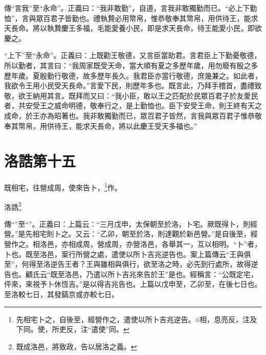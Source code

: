 {\noindent\zhuan{}\fzbyks 傳“言我”至“永命”。正義曰：“我非敢勤”，自道，言我非敢獨勤而已。“必上下勤恤”，言與眾百君子皆勤也。禮執贄必用幣帛，惟恭敬奉其幣帛，用供待王，能求天長命。將以執贄慶王多福，毛能愛養小民，即是求天長命，待王能愛小民，即欲慶之。 \par}

{\noindent\shu{}\fzkt “上下”至“永命”。正義曰：上既勸王敬德，又言臣當助君。言君臣上下勤憂敬德，所以勤者，其言曰：“我周家既受天命，當大順有夏之多歷年歲，用勿廢有殷之多歷年歲。夏殷勤行敬德，故多歷年長久。我君臣亦當行敬德，庶幾兼之。如此者，我欲令王用小民受天長命。”言愛下民，則歷年多也。既言此，乃拜手稽首，盡禮致敬，欲王納用其言。既拜而又曰：“我小臣，敢以王之匹配於民眾百君子於友愛民者，共安受王之威命明德，敬奉行之，是上勤恤也。臣下安受王命，則王終有天之成命，於王亦為昭著也。我非敢獨勤而已，眾百君子皆然，言我與眾百君子惟恭敬奉其幣帛，用供待王，能求天長命，將以此慶王受天多福也。” \par}

\section{洛誥第十五}


既相宅，往營成周，使來告卜，\footnote{先相宅卜之，自後至，經營作之，遣使以所卜吉兆逆告。○相，息亮反，注及下同。使，所吏反，注“遣使”同。}作。

洛誥\footnote{既成洛邑，將致政，告以居洛之義。}


{\noindent\zhuan{}\fzbyks 傳“”至“”。正義曰：上篇云：“三月戊申，太保朝至於洛，卜宅。厥既得卜，則經營。”是先相宅則卜之。又云：“乙卯，朝至於洛，則達觀於新邑營。”是自後至，經營作之。相洛邑，亦相成周，營成周，亦營洛邑，各舉其一，互以相明。“卜”者，卜也。既至洛邑，案行所營之處，遣使以所卜吉兆逆告也。案上篇傳云“王與俱至”，何得至洛逆告王者？王與雖相與俱行，欲至洛之時，必先到行處所，故得逆告也。顧氏云“既至洛邑，乃遣以所卜吉兆來告於王”是也。經稱言：“公既定宅，伻來，來視予卜休恆吉。”是以得吉兆告也。上篇以戊申至，乙卯至，在後七日也。至洛較七日，其發鎬京或亦較七日。 \par}

